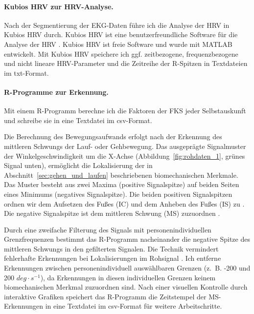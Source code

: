 \paragraph{Kubios HRV zur HRV-Analyse.} 

\label{par:kubios_hrv_zur_hrv_analyse}

Nach der Segmentierung der \ac{EKG}-Daten führe ich die Analyse der \ac{HRV} in Kubios HRV durch. Kubios HRV ist eine benutzerfreundliche Software für die Analyse der \ac{HRV} \citep{Tarvainen2014}. Kubios HRV ist freie Software und wurde mit MATLAB entwickelt. Mit Kubios HRV speichere ich ggf. zeitbezogene, frequenzbezogene und nicht lineare \ac{HRV}-Parameter und die Zeitreihe der R-Spitzen in Textdateien im txt-Format.

\paragraph{R-Programme zur Erkennung.} 

\label{par:r_programme_zur_erkennung}

Mit einem R-Programm berechne ich die Faktoren der \ac{FKS} jeder Selbstauskunft und schreibe sie in eine Textdatei im \acs{csv}-Format.

Die Berechnung des Bewegungsaufwands erfolgt nach der Erkennung des mittleren Schwungs der Lauf- oder Gehbewegung. Das ausgeprägte Signalmuster der Winkelgeschwindigkeit um die X-Achse (Abbildung~\ref{fig:rohdaten_1}, grünes Signal unten), ermöglicht die Lokalisierung der in Abschnitt~\ref{sec:gehen_und_laufen} beschriebenen biomechanischen Merkmale. Das Muster besteht aus zwei Maxima (positive Signalspitze) auf beiden Seiten eines Minimums (negatives Signalspitze). Die beiden positiven Signalspitzen ordnen wir dem Aufsetzen des Fußes (\ac{IC}) und dem Anheben des Fußes (\ac{IS}) zu \citep{Aminian2002}. Die negative Signalspitze ist dem mittleren Schwung (\ac{MS}) zuzuordnen \citep{Aminian2002}.

Durch eine zweifache Filterung des Signals mit personenindividuellen Grenzfrequenzen bestimmt das R-Programm nacheinander die negative Spitze des mittleren Schwungs in den gefilterten Signalen. Die Technik vermindert fehlerhafte Erkennungen bei Lokalisierungen im Rohsignal \citep{Lee2011}. Ich entferne Erkennungen zwischen personenindividuell auswählbaren Grenzen (z.~B. -200 und 200 $deg \cdot s^{-1}$), da Erkennungen in diesen individuellen Grenzen keinem biomechanischen Merkmal zuzuordnen sind. Nach einer visuellen Kontrolle durch interaktive Grafiken speichert das R-Programm die Zeitstempel der \ac{MS}-Erkennungen in eine Textdatei im \acs{csv}-Format für weitere Arbeitschritte.


